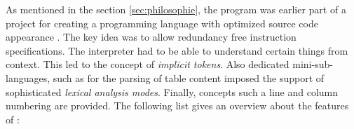 As mentioned in the section \ref{sec:philosophie}, the {\quex} program was
earlier part of a project for creating a programming language with optimized
source code appearance {\SaferTeX}\cite{}. The key idea was to allow
redundancy free instruction specifications. The interpreter had to be able to
understand certain things from context. This led to the concept of {\it
  implicit tokens}. Also dedicated mini-sub-languages, such as for the parsing
of table content imposed the support of sophisticated {\it lexical analysis
  modes}. Finally, concepts such a line and column numbering are provided.
The following list gives an overview about the features of {\quex}:


